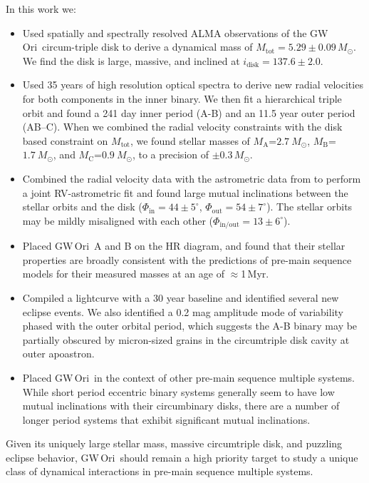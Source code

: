 \documentclass[twocolumn]{aastex61}
\newcommand{\obj}{GW\,Ori}
\begin{document}
In this work we:
\begin{itemize}
\item Used spatially and spectrally resolved ALMA observations of the \obj\ circum-triple disk to derive a dynamical mass of $M_\mathrm{tot} = 5.29 \pm 0.09\,M_\odot$. We find the disk is large, massive, and inclined at $i_\mathrm{disk} = 137.6\pm2.0$\degr.
\item Used 35 years of high resolution optical spectra to derive new radial velocities for both components in the inner binary. We then fit a hierarchical triple orbit and found a 241 day inner period (A-B) and an 11.5 year outer period (AB--C). When we combined the radial velocity constraints with the disk based constraint on $M_\mathrm{tot}$, we found stellar masses of $M_\mathrm{A}$=$2.7~M_\odot$, $M_\mathrm{B}$=$1.7~M_\odot$, and $M_\mathrm{C}$=$0.9~M_\odot$, to a precision of $\pm 0.3\,M_\odot$.
\item Combined the radial velocity data with the astrometric data from \citet{berger11} to perform a joint RV-astrometric fit and found large mutual inclinations between the stellar orbits and the disk ($\Phi_\mathrm{in} = 44\pm5^\circ$, $\Phi_\mathrm{out} = 54 \pm 7^\circ$). The stellar orbits may be mildly misaligned with each other ($\Phi_\mathrm{in/out} = 13 \pm 6^\circ$).
\item Placed \obj~A and B on the HR diagram, and found that their stellar properties are broadly consistent with the predictions of pre-main sequence models for their measured masses at an age of $\approx$1\,Myr.
\item Compiled a lightcurve with a 30 year baseline and identified several new eclipse events. We also identified a 0.2 mag amplitude mode of variability phased with the outer orbital period, which suggests the A-B binary may be partially obscured by micron-sized grains in the circumtriple disk cavity at outer apoastron.
\item Placed \obj\ in the context of other pre-main sequence multiple systems. While short period eccentric binary systems generally seem to have low mutual inclinations with their circumbinary disks, there are a number of longer period systems that exhibit significant mutual inclinations.
\end{itemize}

Given its uniquely large stellar mass, massive circumtriple disk, and puzzling eclipse behavior, \obj\ should remain a high priority target to study a unique class of dynamical interactions in pre-main sequence multiple systems.
\end{document}
